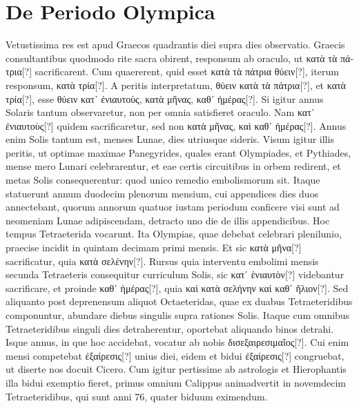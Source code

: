 \section{De Periodo Olympica}
Vetustissima res est apud Graecos quadrantis diei supra
 dies observatio.
Graecis consultantibus quodmodo
rite sacra obirent, responsum ab oraculo,
 ut \textgreek{κατὰ τὰ πάτρια[?]} sacrificarent.
Cum quaererent, quid esset \textgreek{κατὰ τὰ πάτρια θύειν[?]},
 iterum responsum,
\textgreek{κατὰ τρία[?]}.
A peritis interpretatum, \textgreek{θύειν κατὰ τὰ πάτρια[?]},
 et \textgreek{κατὰ τρία[?]},
esse \textgreek{θύειν κατ᾽ ἐνιαυτοὺς, κατὰ μῆνας, καθ᾽ ἡμέρας[?]}.
Si igitur annus Solaris tantum
observaretur, non per omnia satisfieret oraculo.
Nam \textgreek{κατ᾽ ἐνιαυτοὺς[?]}
quidem sacrificaretur, sed non \textgreek{κατὰ μῆνας, καὶ καθ᾽ ἡμέρας[?]}.
Annus enim
Solis tantum est, menses Lunae, dies utriusque sideris.
Visum igitur
illis peritis, ut optimae maximae Panegyrides, quales erant Olympiades,
et Pythiades, mense mero Lunari celebrarentur, et eae certis circuitibus
in orbem redirent, et metas Solis consequerentur: quod unico
remedio embolismorum sit.
Itaque statuerunt annum duodecim plenorum
mensium, cui appendices dies duos annectebant, quorum annorum
quatuor iustam periodum conficere visi sunt ad neomeniam
Lunae adipiscendam, detracto uno die de illis appendicibus.
Hoc tempus
Tetraeterida vocarunt.
Ita Olympias, quae debebat celebrari plenilunio,
praecise incidit in quintam decimam primi mensis.
Et sic \textgreek{κατὰ μῆνα[?]}
sacrificatur, quia \textgreek{κατὰ σελένην[?]}.
Rursus quia interventu embolimi mensis
secunda Tetraeteris consequitur curriculum Solis,
 sic \textgreek{κατ᾽ ἑνιαυτὸν[?]} videbantur
sacrificare, et proinde \textgreek{καθ᾽ ἡμέρας[?]},
 quia \textgreek{καὶ κατὰ σελήνην καὶ καθ᾽
ἥλιον[?]}.
Sed aliquanto post deprenensum aliquot Octaeteridas, quae ex
duabus Tetraeteridibus componuntur, abundare diebus singulis supra
rationes Solis.
Itaque cum omnibus Tetraeteridibus singuli dies detraherentur,
oportebat aliquando binos detrahi.
Isque annus, in que hoc
accidebat, vocatur ab nobis \textgreek{δισεξαιρεσιμαῖος[?]}.
Cui enim mensi competebat
\textgreek{ἐξαίρεσις[?]} unius diei, eidem et bidui
 \textgreek{ἐξαίρεσις[?]} congruebat, ut diserte
nos docuit Cicero.
Cum igitur pertissime ab astrologis et Hierophantis
illa bidui exemptio fieret, primus omnium Calippus animadvertit
in novemdecim Tetraeteridibus, qui sunt anni 76, quater biduum eximendum.
